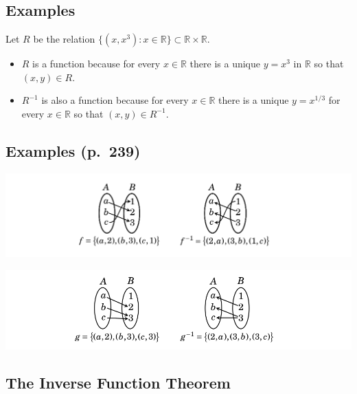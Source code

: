 \documentclass[
]{article}
\providecommand{\tightlist}{%
  \setlength{\itemsep}{0pt}\setlength{\parskip}{0pt}}
\begin{document}
\vfill\eject

\hypertarget{examples-1}{%
\subsection{Examples}\label{examples-1}}

Let \(R\) be the relation
\(\{(x,x^3):x\in\mathbb{R}\}\subset\mathbb{R}\times\mathbb{R}\).

\begin{itemize}
\tightlist
\item
  \(R\) is a function because for every \(x\in\mathbb{R}\) there is a
  unique \(y=x^3\) in \(\mathbb{R}\) so that \((x,y)\in R\).
\end{itemize}

\vfill

\begin{itemize}
\tightlist
\item
  \(R^{-1}\) is also a function because for every \(x\in\mathbb{R}\)
  there is a unique \(y=x^{1/3}\) for every \(x\in\mathbb{R}\) so that
  \((x,y)\in R^{-1}\).
\end{itemize}

\vfill\eject

\hypertarget{examples-p.-239}{%
\subsection{Examples (p.~239)}\label{examples-p.-239}}

\includegraphics{../../png/InverseExample1.png}

\vfill

\includegraphics{../../png/InverseExample2.png}

\vfill\eject

\hypertarget{the-inverse-function-theorem}{%
\subsection{The Inverse Function
Theorem}\label{the-inverse-function-theorem}}
\end{document}
